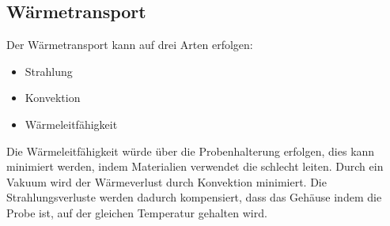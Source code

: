 \subsection{Wärmetransport}
Der Wärmetransport kann auf drei Arten erfolgen:
\begin{itemize}
  \item Strahlung
  \item Konvektion
  \item Wärmeleitfähigkeit
\end{itemize}
Die Wärmeleitfähigkeit würde über die Probenhalterung erfolgen,
dies kann minimiert werden, indem Materialien verwendet die schlecht leiten.
Durch ein Vakuum wird der Wärmeverlust durch Konvektion minimiert.
Die Strahlungsverluste werden dadurch kompensiert, dass das Gehäuse indem die Probe ist,
auf der gleichen Temperatur gehalten wird.
